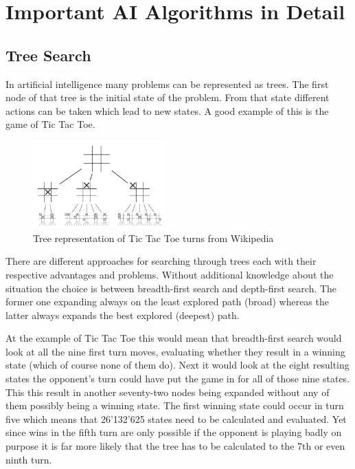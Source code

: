 \newpage
\section{Important AI Algorithms in Detail}
\subsection{Tree Search}

In artificial intelligence many problems can be represented as trees. The first node of that tree is the initial state of the problem. From that state different actions can be taken which lead to new states. A good example of this is the game of Tic Tac Toe.

\begin{figure}[H]
  \includegraphics[width=0.45\textwidth]{images/tree_search_tic_tac_toe.png}
  \caption[\url{http://en.wikipedia.org/wiki/Tic-tac-toe}]{Tree representation of Tic Tac Toe turns from Wikipedia}
\end{figure}

There are different approaches for searching through trees each with their respective advantages and problems. Without additional knowledge about the situation the choice is between breadth-first search and depth-first search. The former one expanding always on the least explored path (broad) whereas the latter always expands the best explored (deepest) path. 

At the example of Tic Tac Toe this would mean that breadth-first search would look at all the nine first turn moves, evaluating whether they result in a winning state (which of course none of them do). Next it would look at the eight resulting states the opponent's turn could have put the game in for all of those nine states. This this result in another seventy-two nodes being expanded without any of them possibly being a winning state. The first winning state could occur in turn five which means that 26'132'625 states need to be calculated and evaluated. Yet since wins in the fifth turn are only possible if the opponent is playing badly on purpose it is far more likely that the tree has to be calculated to the 7th or even ninth turn.

